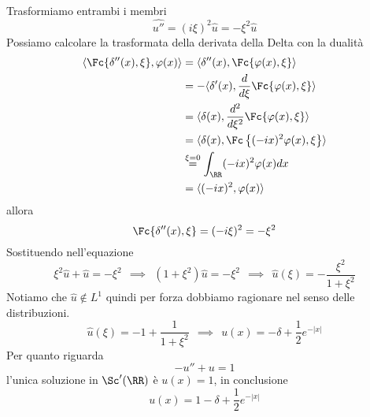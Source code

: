 Trasformiamo entrambi i membri
\begin{equation*}
\widehat{u''} = (i\xi)^{2}\hat{u} = - \xi^{2}\hat{u}
\end{equation*}
Possiamo calcolare la trasformata della derivata della Delta con la dualità
\begin{align*}
\langle \Fc \{\delta''(x), \xi \}, \varphi (x) \rangle & = \langle \delta''(x), \Fc \{\varphi (x), \xi \} \rangle \\
 & = - \langle \delta'(x), \frac{d}{d\xi}\Fc \{\varphi (x), \xi \} \rangle \\
 & = \langle \delta (x), \frac{d^{2}}{d\xi^{2}}\Fc \{\varphi (x), \xi \} \rangle \\
 & = \langle \delta (x), \Fc \left\{(- ix)^{2} \varphi (x), \xi \right\} \rangle \\
 & \overset{\xi = 0}{=}\int_{\RR}(- ix)^{2} \varphi (x) dx\\
 & = \langle (- ix)^{2}, \varphi (x) \rangle
\end{align*}
allora
\begin{equation*}
\Fc \{\delta''(x), \xi \} = (- i\xi)^{2} = - \xi^{2}
\end{equation*}
Sostituendo nell'equazione
\begin{equation*}
\xi^{2}\hat{u} + \hat{u} = - \xi^{2} \ \ \implies \ \ \left(1 + \xi^{2}\right)\hat{u} = - \xi^{2} \ \ \implies \ \ \hat{u}(\xi) = - \frac{\xi^{2}}{1 + \xi^{2}}
\end{equation*}
Notiamo che $\hat{u} \notin L^{1}$ quindi per forza dobbiamo ragionare nel senso delle distribuzioni.
\begin{equation*}
\hat{u}(\xi) = - 1 + \frac{1}{1 + \xi^{2}} \ \ \implies \ \ u(x) = - \delta + \frac{1}{2} e^{- | x|}
\end{equation*}
Per quanto riguarda
\begin{equation*}
- u'' + u = 1
\end{equation*}
l'unica soluzione in $\Sc'(\RR)$ è $u(x) = 1$, in conclusione
\begin{equation*}
u(x) = 1 - \delta + \frac{1}{2} e^{- | x|}
\end{equation*}

\Soluzione

